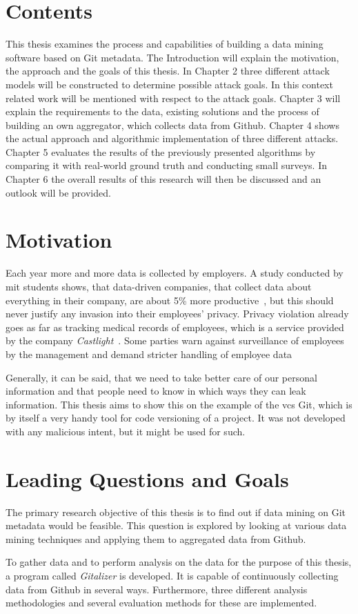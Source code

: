 \section{Contents}
This thesis examines the process and capabilities of building a data mining software based on Git metadata.
The Introduction will explain the motivation, the approach and the goals of this thesis.
In Chapter 2 three different attack models will be constructed to determine possible attack goals.
In this context related work will be mentioned with respect to the attack goals.
Chapter 3 will explain the requirements to the data, existing solutions and the process of building an own aggregator, which collects data from Github.
Chapter 4 shows the actual approach and algorithmic implementation of three different attacks.
Chapter 5 evaluates the results of the previously presented algorithms by comparing it with real-world ground truth and conducting small surveys.
In Chapter 6 the overall results of this research will then be discussed and an outlook will be provided.

\section{Motivation}
Each year more and more data is collected by employers.
A study conducted by \ac{mit} students shows, that data-driven companies, that collect data about everything in their company, are about 5\% more productive~\cite{article:management-revolution}, but this should never justify any invasion into their employees' privacy.
Privacy violation already goes as far as tracking medical records of employees, which is a service provided by the company \emph{Castlight}~\cite{article:medical-data}.
Some parties warn against surveillance of employees by the management and demand stricter handling of employee data~\cite{article:vermessung-belegschaft}

Generally, it can be said, that we need to take better care of our personal information and that people need to know in which ways they can leak information.
This thesis aims to show this on the example of the \ac{vcs} Git, which is by itself a very handy tool for code versioning of a project.
It was not developed with any malicious intent, but it might be used for such.

\section{Leading Questions and Goals}

The primary research objective of this thesis is to find out if data mining on Git metadata would be feasible.
This question is explored by looking at various data mining techniques and applying them to aggregated data from Github.

To gather data and to perform analysis on the data for the purpose of this thesis, a program called \emph{Gitalizer} is developed.
It is capable of continuously collecting data from Github in several ways.
Furthermore, three different analysis methodologies and several evaluation methods for these are implemented.
